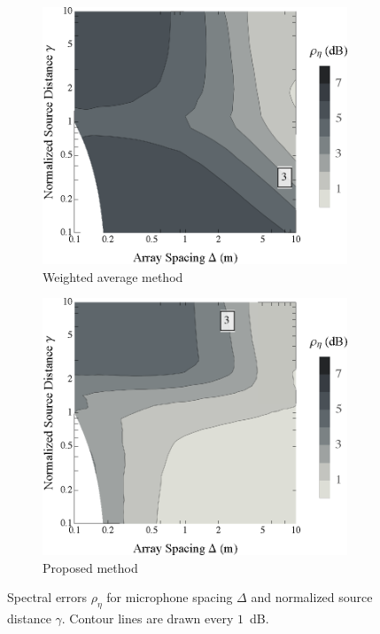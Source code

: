 \begin{figure}[t]
    	\centering
    	\begin{subfigure}[b]{0.49\textwidth}
        		\includegraphics[width=\textwidth]{08_proposed_method/figures/scharer2009_contour_xf.eps}
        		\caption{Weighted average method}
        		\label{fig:08_Proposed_Method:Spectral_Errors:XF}
    	\end{subfigure}
	\hfill
	\begin{subfigure}[b]{0.49\textwidth}
        		\includegraphics[width=\textwidth]{08_proposed_method/figures/scharer2009_contour_validhybrid.eps}
        		\caption{Proposed method}
        		\label{fig:08_Proposed_Method:Spectral_Errors:Hybrid}
    	\end{subfigure}
	
    	\caption[Contour plots of spectral errors for each interpolation method.]{
	Spectral errors $\rho_\eta$ for microphone spacing $\Delta$ and normalized source distance $\gamma$.
  Contour lines are drawn every $1$~dB.}
    	\label{fig:08_Proposed_Method:Spectral_Errors}
\end{figure}

